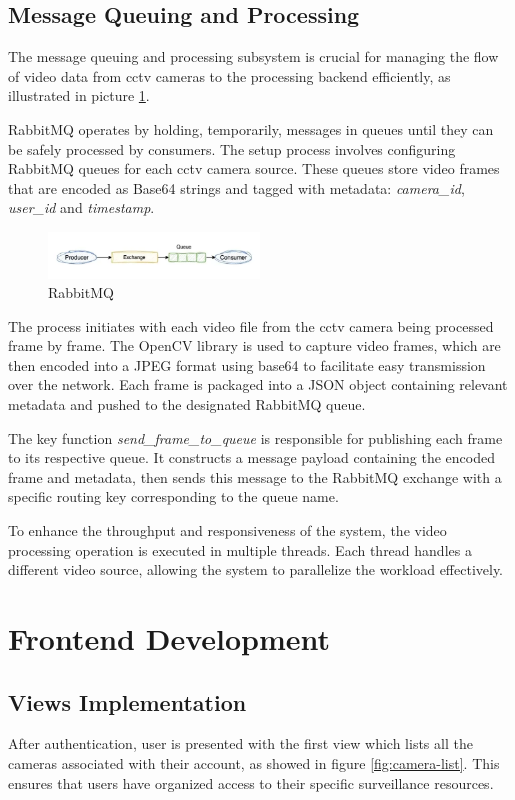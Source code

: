 \subsection{Message Queuing and Processing}
The message queuing and processing subsystem is crucial for managing the flow of video data from \ac{cctv} cameras to 
the processing backend efficiently, as illustrated in picture \ref{fig:rabbit-mq}. 

RabbitMQ operates by holding, temporarily, messages in queues until they can be safely processed by consumers. 
The setup process involves configuring RabbitMQ queues for each \ac{cctv} camera source. 
These queues store video frames that are encoded as Base64 strings and tagged with metadata: \textit{camera\_id}, 
\textit{user\_id} 
and \textit{timestamp}.

\begin{figure}[h]
    \centering 
    \includegraphics[width=0.5\textwidth]{figs/rabbitmq.png} 
    \caption{RabbitMQ~\cite{rfc48}}
    \label{fig:rabbit-mq}
\end{figure}

The process initiates with each video file from the \ac{cctv} camera being processed frame by 
frame. The OpenCV library \cite{rfc59} is used to capture video frames, which are then encoded into a JPEG format using base64 to 
facilitate easy transmission over the network. Each frame is packaged into a JSON object containing relevant metadata 
and pushed to the designated RabbitMQ queue.

The key function \textit{send\_frame\_to\_queue} is responsible for publishing each frame to its respective queue. 
It constructs a message payload containing the encoded frame and metadata, then sends
this message to the RabbitMQ exchange with a specific routing key corresponding to the queue name.

To enhance the throughput and responsiveness of the system, the video processing operation is executed in multiple 
threads. Each thread handles a different video source, allowing the system to parallelize the workload effectively.
\section{Frontend Development}
\subsection{Views Implementation}
After authentication, user is presented with the first view which lists all the cameras 
associated with their account, as showed in figure \ref{fig:camera-list}. This ensures that users have organized access to 
their specific surveillance resources. 


